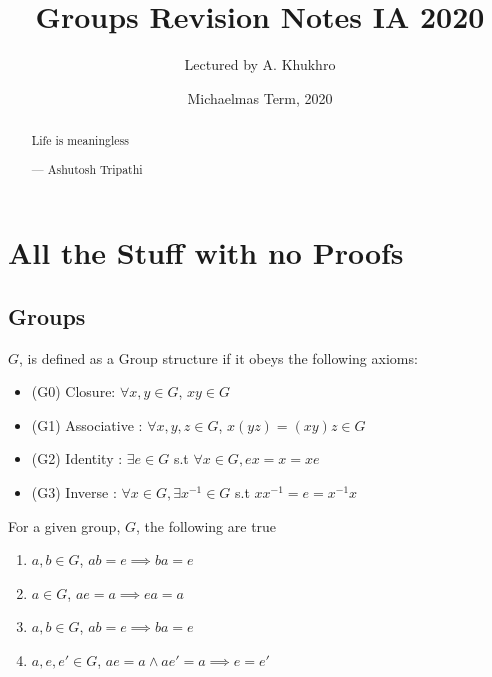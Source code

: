 \documentclass[11pt]{scrartcl}
\begin{document}
\title{Groups Revision Notes IA 2020} %
\subtitle{Lectured by A. Khukhro}
\date{Michaelmas Term, 2020}
\maketitle

\begin{abstract}
	\sffamily\small
	Life is meaningless

	\medskip

	--- Ashutosh Tripathi
\end{abstract}

\tableofcontents
\newpage


\vspace{1em}

\section{All the Stuff with no Proofs}
\subsection{Groups}
\begin{definitions}  
$G$, is defined as a Group  structure if it obeys the following axioms:
\begin{itemize}
    \item (G0) Closure: $\forall x,y \in G$, $xy \in G$
    \item (G1) Associative : $\forall x,y,z \in G$, $ x(yz)=(xy)z\in G$
    \item (G2) Identity : $\exists e \in G$ s.t $\forall x \in G, ex=x=xe$
    \item (G3) Inverse : $\forall x \in G, \exists x^{-1} \in G$ s.t $xx^{-1} = e = x^{-1}x $
\end{itemize}
\end{definitions}

\begin{prop}
For a given group, $G$, the following are true
\begin{enumerate}
    \item $a,b \in G$, $ab=e \implies ba=e$
    \item $a \in G$, $ae=a \implies ea=a$
    \item $a,b \in G$, $ab=e \implies ba=e$
    \item $a,e,e' \in G$, $ae=a \land ae'=a \implies e=e'$
\end{enumerate}
\end{prop}
\end{document}
